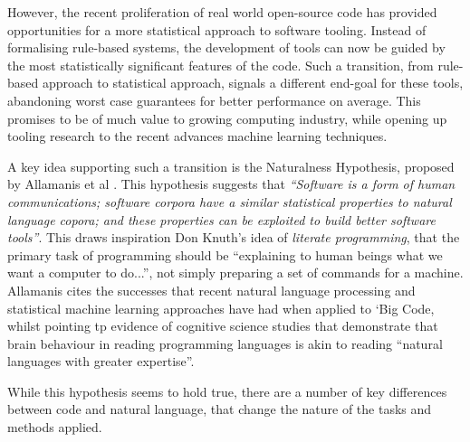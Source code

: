 
However, the recent proliferation of real world open-source code has provided opportunities for a more statistical approach to software tooling. 
Instead of formalising rule-based systems, the development of tools can now be guided by the most statistically significant features of the code.
Such a transition, from rule-based approach to statistical approach, signals a different end-goal for these tools, abandoning worst case guarantees for better performance on average. %
This promises to be of much value to growing computing industry, while opening up tooling research to the recent advances machine learning techniques.
 
A key idea supporting such a transition is the Naturalness Hypothesis, proposed by Allamanis et al \cite{allamanis_mining_nodate}. 
This hypothesis suggests that \textit{``Software is a form of human communications; software corpora have a similar statistical properties to natural language copora; and these properties can be exploited to build better software tools''}.\cite{allamanis_mining_nodate} 
This draws inspiration Don Knuth's idea of \textit{literate programming}\cite{knuth_literate_1984}, that the primary task of programming should be ``explaining to human beings what we want a computer to do...''\cite{knuth_literate_1984}, not simply preparing a set of commands for a machine.
Allamanis cites the successes that recent natural language processing and statistical machine learning approaches have had when applied to `Big Code, whilst pointing tp evidence of cognitive science studies that demonstrate that brain behaviour in reading programming languages is akin to reading ``natural languages with greater expertise''\cite{floyd_decoding_2017}.

While this hypothesis seems to hold true,  there are a number of key differences between code and natural language, that change the nature of the tasks and methods applied.



